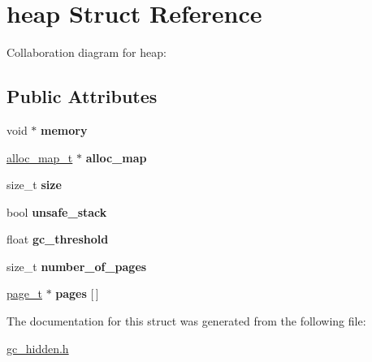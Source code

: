 \hypertarget{structheap}{}\section{heap Struct Reference}
\label{structheap}


Collaboration diagram for heap\+:
\subsection*{Public Attributes}
\begin{DoxyCompactItemize}
\item 
\hypertarget{structheap_aef54d9a3db63859dcfa9a38ebb42823e}{}void $\ast$ {\bfseries memory}\label{structheap_aef54d9a3db63859dcfa9a38ebb42823e}

\item 
\hypertarget{structheap_a01357129b314f4f004b7273869a01ec2}{}\hyperlink{alloc__map_8h_a1dd850d0c221c065db145344bbd56714}{alloc\+\_\+map\+\_\+t} $\ast$ {\bfseries alloc\+\_\+map}\label{structheap_a01357129b314f4f004b7273869a01ec2}

\item 
\hypertarget{structheap_a4c25bc4241337fdea12b53bf8185070d}{}size\+\_\+t {\bfseries size}\label{structheap_a4c25bc4241337fdea12b53bf8185070d}

\item 
\hypertarget{structheap_ac060d2df3b78970d9c23fc1dcec2a921}{}bool {\bfseries unsafe\+\_\+stack}\label{structheap_ac060d2df3b78970d9c23fc1dcec2a921}

\item 
\hypertarget{structheap_aa6580886a3ce54095739d5e07b1bda74}{}float {\bfseries gc\+\_\+threshold}\label{structheap_aa6580886a3ce54095739d5e07b1bda74}

\item 
\hypertarget{structheap_ade55f22f4a2861e9f3a3e3bc6eb32471}{}size\+\_\+t {\bfseries number\+\_\+of\+\_\+pages}\label{structheap_ade55f22f4a2861e9f3a3e3bc6eb32471}

\item 
\hypertarget{structheap_af87be11cb17953345d1ed8034900cadf}{}\hyperlink{structpage}{page\+\_\+t} $\ast$ {\bfseries pages} \mbox{[}$\,$\mbox{]}\label{structheap_af87be11cb17953345d1ed8034900cadf}

\end{DoxyCompactItemize}


The documentation for this struct was generated from the following file\+:\begin{DoxyCompactItemize}
\item 
\hyperlink{gc__hidden_8h}{gc\+\_\+hidden.\+h}\end{DoxyCompactItemize}
